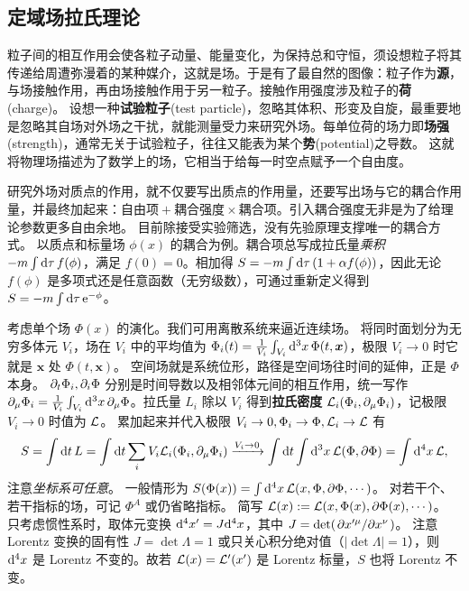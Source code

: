\subsection{定域场拉氏理论}\label{sec:Lag-Noe}

粒子间的相互作用会使各粒子动量、能量变化，为保持总和守恒，须设想粒子将其传递给周遭弥漫着的某种媒介，这就是场。于是有了最自然的图像：粒子作为\textbf{源}，与场接触作用，再由场接触作用于另一粒子。接触作用强度涉及粒子的\textbf{荷}(charge)。
设想一种\textbf{试验粒子}(test particle)，忽略其体积、形变及自旋，最重要地是忽略其自场对外场之干扰，就能测量受力来研究外场。每单位荷的场力即\textbf{场强}(strength)，通常无关于试验粒子，往往又能表为某个\textbf{势}(potential)之导数。
这就将物理场描述为了数学上的场，它相当于给每一时空点赋予一个自由度。

研究外场对质点的作用，就不仅要写出质点的作用量，还要写出场与它的耦合作用量，并最终加起来：$\textit{自由项}+\textit{耦合强度}\times\textit{耦合项}$。引入耦合强度无非是为了给理论参数更多自由余地。
目前除接受实验筛选，没有先验原理支撑唯一的耦合方式。
以质点和标量场 $\phi(x)$ 的耦合为例。耦合项总写成拉氏量\textit{乘积} $-m\int\dd{\tau}f(\phi)$，满足 $f(0)=0$。相加得 $S=-m\int\dd{\tau}(1+\alpha f(\phi))$，因此无论 $f(\phi)$ 是多项式还是任意函数（无穷级数），可通过重新定义得到 $S=-m\int\dd{\tau}\mathrm{e}^{-\phi}$。

考虑单个场 $\Phi(x)$ 的演化。我们可用离散系统来逼近连续场。
将同时面划分为无穷多体元 $V_i$，场在 $V_i$ 中的平均值为 $\Phi_i(t) = \frac{1}{V_i}\int_{V_i}\dd[3]{x} \Phi(t,\bm x)$，极限 $V_i\to 0$ 时它就是 $\bm x$ 处 $\Phi(t,\bm x)$。
空间场就是系统位形，路径是空间场往时间的延伸，正是 $\Phi$ 本身。
$\partial_t\Phi_i,\partial_i\Phi$ 分别是时间导数以及相邻体元间的相互作用，统一写作 $\partial_\mu\Phi_i=\frac{1}{V_i}\int_{V_i}\dd[3]{x} \partial_\mu\Phi$。拉氏量 $L_i$ 除以 $V_i$ 得到\textbf{拉氏密度} $\mathcal{L}_i(\Phi_i,\partial_\mu\Phi_i)$，记极限 $V_i\to 0$ 时值为 $\mathcal{L}$。
累加起来并代入极限 $V_i\to 0,\Phi_i\to\Phi,\mathcal{L}_i\to\mathcal{L}$ 有
\[
    S = \int\dd{t}L=\int\dd t\sum_i V_i\mathcal{L}_i(\Phi_i,\partial_\mu\Phi_i) \xrightarrow{V_i\to 0}\int\dd t\int\dd[3]{x}\mathcal{L}(\Phi,\partial\Phi)=\int\dd[4]{x}\mathcal{L},
\]
注意\textit{坐标系可任意}。
一般情形为 $S(\Phi(x))=\int\dd[4]{x}\mathcal{L}(x,\Phi,\partial\Phi,\cdots)$。
对若干个、若干指标的场，可记 $\Phi^A$ 或仍省略指标。
简写 $\mathcal{L}(x):=\mathcal{L}(x,\Phi(x),\partial\Phi(x),\cdots)$。
只考虑惯性系时，取体元变换 $\dd[4]x'=J\dd[4]x$，其中 $J=\det(\pdv*{x'^\mu}{x^\nu})$。
注意 Lorentz 变换的固有性 $J=\det\Lambda=1$ 或只关心积分绝对值（$|\det\Lambda|=1$），则 $\dd[4]x$ 是 Lorentz 不变的。故若 $\mathcal{L}(x)=\mathcal{L}'(x')$ 是 Lorentz 标量，$S$ 也将 Lorentz 不变。


